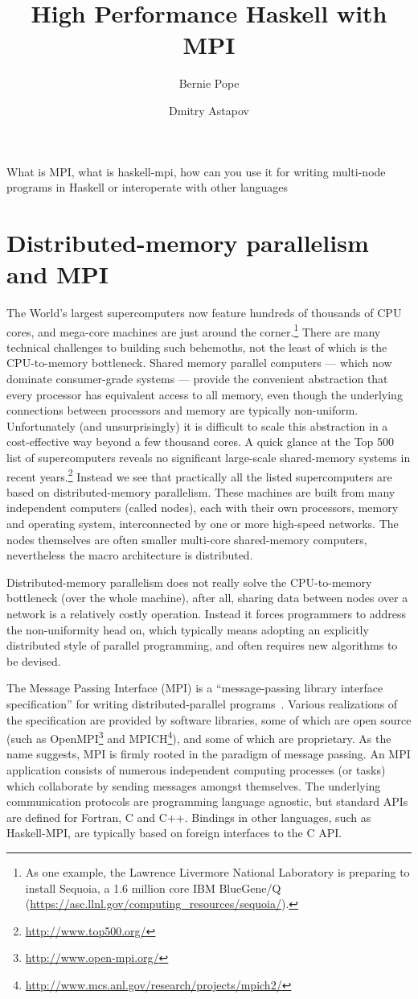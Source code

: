 \documentclass{tmr}
\title{High Performance Haskell with MPI}
\author{Bernie Pope\email{bjpope@unimelb.edu.au}}
\author{Dmitry Astapov\email{dastapov@gmail.com}}
\begin{document}
\begin{introduction} 
What is MPI, what is haskell-mpi, how can you use it for writing multi-node programs in Haskell or interoperate with other languages
\end{introduction}

\section{Distributed-memory parallelism and MPI}

The World's largest supercomputers now feature hundreds of thousands of CPU cores, and mega-core machines
are just around the corner.\footnote{As one example, the Lawrence Livermore National Laboratory
is preparing to install Sequoia, a 1.6 million core IBM BlueGene/Q (\url{https://asc.llnl.gov/computing_resources/sequoia/}).} There are many technical
challenges to building such behemoths, not the least of which is
the CPU-to-memory bottleneck. Shared memory parallel computers --- which now dominate consumer-grade
systems --- provide the convenient abstraction that every processor has equivalent access to all memory,
even though the underlying connections between processors and memory are typically non-uniform.
Unfortunately (and unsurprisingly) it is difficult to scale this abstraction in a
cost-effective way beyond a few thousand cores. A quick glance at the Top 500 list of supercomputers reveals
no significant large-scale shared-memory systems in recent years.\footnote{\url{http://www.top500.org/}}
Instead we see that practically all the listed supercomputers are based on
distributed-memory parallelism. These machines are built from many independent computers (called nodes),
each with their own processors, memory and operating system, interconnected by one or more high-speed networks.
The nodes themselves are often smaller multi-core shared-memory computers, nevertheless
the macro architecture is distributed.

Distributed-memory parallelism does not really solve the CPU-to-memory bottleneck (over the whole machine),
after all, sharing data between nodes over a network is a relatively costly operation.
Instead it forces programmers to
address the non-uniformity head on, which typically means adopting an explicitly distributed style of
parallel programming, and often requires new algorithms to be devised.

The Message Passing Interface (MPI) is a ``message-passing library interface specification''
for writing distributed-parallel programs~\cite{mpi-report}. Various realizations of the
specification are provided by software libraries, some of which are open source
(such as OpenMPI\footnote{\url{http://www.open-mpi.org/}} and MPICH\footnote{\url{http://www.mcs.anl.gov/research/projects/mpich2/}}), and some of which are proprietary.
As the name suggests, MPI is firmly rooted in the paradigm of message passing.
An MPI application consists of numerous independent computing processes (or tasks)
which collaborate by sending messages amongst themselves.
The underlying communication protocols are programming language agnostic, but standard APIs are
defined for Fortran, C and C++. Bindings in other languages, such as Haskell-MPI,
are typically based on foreign interfaces to the C API.
\end{document}
